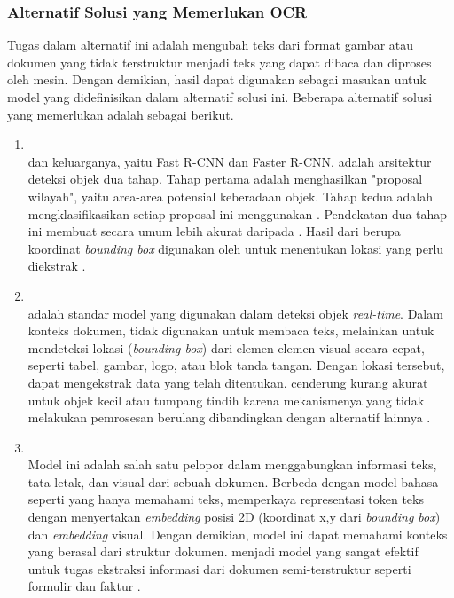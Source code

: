 \subsubsection{Alternatif Solusi yang Memerlukan OCR}
\label{subsubsec:alternatif-solusi-memerlukan-ocr}
Tugas \ocr{} dalam alternatif ini adalah mengubah teks dari format gambar atau dokumen yang tidak terstruktur menjadi teks yang dapat dibaca dan diproses oleh mesin. Dengan demikian, hasil \ocr{} dapat digunakan sebagai masukan untuk model yang didefinisikan dalam alternatif solusi ini. Beberapa alternatif solusi yang memerlukan \ocr{} adalah sebagai berikut.
\begin{enumerate}
    \item \rcnn{} ~\\ \rcnn{} dan keluarganya, yaitu Fast R-CNN dan Faster R-CNN, adalah arsitektur deteksi objek dua tahap. Tahap pertama adalah menghasilkan "proposal wilayah", yaitu area-area potensial keberadaan objek. Tahap kedua adalah mengklasifikasikan setiap proposal ini menggunakan \cnn. Pendekatan dua tahap ini membuat \rcnn{} secara umum lebih akurat daripada \yolo. Hasil dari \rcnn{} berupa koordinat \emph{bounding box} digunakan oleh \ocr{} untuk menentukan lokasi yang perlu diekstrak \parencite{xie2021oriented}.
    \item \yolo ~\\ \yolo{} adalah standar model yang digunakan dalam deteksi objek \textit{real-time}. Dalam konteks dokumen, \yolo{} tidak digunakan untuk membaca teks, melainkan untuk mendeteksi lokasi (\emph{bounding box}) dari elemen-elemen visual secara cepat, seperti tabel, gambar, logo, atau blok tanda tangan. Dengan lokasi tersebut, \ocr{} dapat mengekstrak data yang telah ditentukan. \yolo{} cenderung kurang akurat untuk objek kecil atau tumpang tindih karena mekanismenya yang tidak melakukan pemrosesan berulang dibandingkan dengan alternatif lainnya \parencite{diwan2023object}.
    \item \layoutlm ~\\ Model ini adalah salah satu pelopor dalam menggabungkan informasi teks, tata letak, dan visual dari sebuah dokumen. Berbeda dengan model bahasa seperti \bert{} yang hanya memahami teks, \layoutlm{} memperkaya representasi token teks dengan menyertakan \textit{embedding} posisi 2D (koordinat x,y dari \emph{bounding box}) dan \textit{embedding} visual. Dengan demikian, model ini dapat memahami konteks yang berasal dari struktur dokumen. \layoutlm{} menjadi model yang sangat efektif untuk tugas ekstraksi informasi dari dokumen semi-terstruktur seperti formulir dan faktur \parencite{xu2020layoutlm}.

\end{enumerate}
